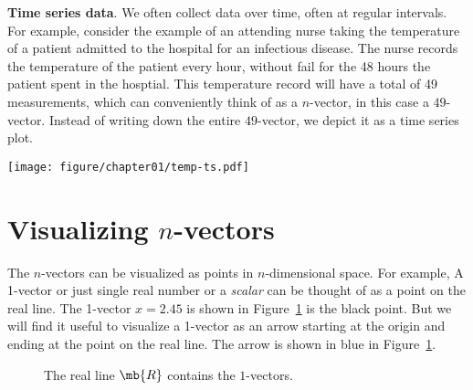 \begin{boxedstuff}
    \begin{example}
        \textbf{Time series data}. We often collect data over time, often at regular intervals. For example, consider the example of an attending nurse taking the temperature of a patient admitted to the hospital for an infectious disease. The nurse records the temperature of the patient every hour, without fail for the 48 hours the patient spent in the hosptial. This temperature record will have a total of 49 measurements, which can conveniently think of as a $n$-vector, in this case a $49$-vector. Instead of writing down the entire $49$-vector, we depict it as a time series plot.
        \begin{center}
            \texttt{[image: figure/chapter01/temp-ts.pdf]}
        \end{center}
    \end{example}
\end{boxedstuff}

\section{Visualizing $n$-vectors}
The $n$-vectors can be visualized as points in $n$-dimensional space. For example, A 1-vector or just single real number or a \textit{scalar} can be thought of as a point on the real line. The 1-vector $x = 2.45$ is shown in Figure~\ref{fig:ch01-1-vector} is the black point. But we will find it useful to visualize a 1-vector as an arrow starting at the origin and ending at the point on the real line. The arrow is shown in blue in Figure~\ref{fig:ch01-1-vector}. 

\begin{figure}[b]
    \centering
    \caption{The real line $\mb{R}$ contains the $1$-vectors.}
    \label{fig:ch01-1-vector}
\end{figure}

